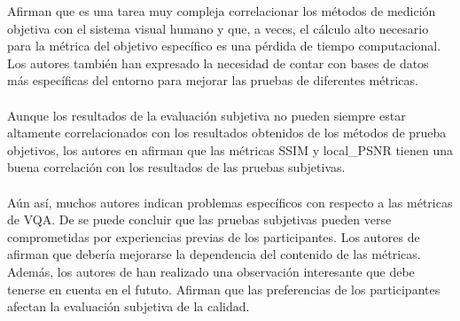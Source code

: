 \documentclass[conference]{IEEEtran}
\begin{document}
    Afirman que es una tarea muy compleja correlacionar los métodos de 
    medición objetiva con el sistema visual humano y que, a veces, el 
    cálculo alto necesario para la métrica del objetivo específico es una 
    pérdida de tiempo computacional. Los autores también han 
    expresado la necesidad de contar con bases de datos más 
    específicas del entorno para mejorar las pruebas de diferentes métricas.\\
    \\
    Aunque los resultados de la evaluación subjetiva no pueden 
    siempre estar altamente correlacionados con los resultados 
    obtenidos de los métodos de prueba objetivos, los autores en \cite{biblio18}
    afirman que las métricas SSIM y local\_PSNR tienen una buena 
    correlación con los resultados de las pruebas subjetivas.\\
    \\
    Aún así, muchos autores indican problemas específicos con respecto
    a las métricas de VQA. De \cite{biblio19} se puede concluir que las pruebas 
    subjetivas pueden verse comprometidas por experiencias previas de 
    los participantes. Los autores de \cite{biblio7}afirman que debería mejorarse la 
    dependencia del contenido de las métricas. Además, los autores de \cite{biblio20} 
    han realizado una observación interesante que debe tenerse en 
    cuenta en el fututo. Afirman que las preferencias de los participantes 
    afectan la evaluación subjetiva de la calidad.
\end{document}
